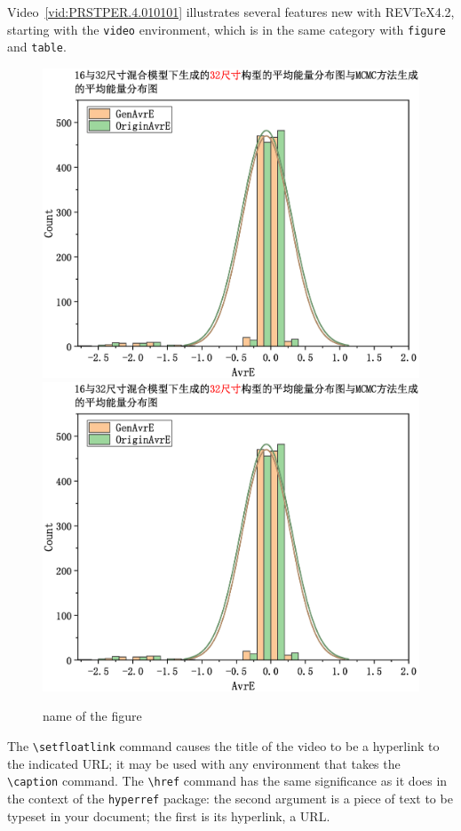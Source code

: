 \documentclass[%
reprint,
amsmath,amssymb,
aps,
]{revtex4-2}
\begin{document}
		Video~\ref{vid:PRSTPER.4.010101} 
		illustrates several features new with REV\TeX4.2,
		starting with the \texttt{video} environment, which is in the same category with
		\texttt{figure} and \texttt{table}.%
		\begin{figure}	
			\centering
			\includegraphics[scale=0.15]{16mix_32_T_3}
			\includegraphics[scale=0.15]{16mix32_32_T_3}
			\caption{name of the figure} %
		\end{figure}
		The \verb+\setfloatlink+ command causes the title of the video to be a hyperlink to the
		indicated URL; it may be used with any environment that takes the \verb+\caption+
		command.
		The \verb+\href+ command has the same significance as it does in the context of
		the \texttt{hyperref} package: the second argument is a piece of text to be 
		typeset in your document; the first is its hyperlink, a URL.
		
\end{document}
